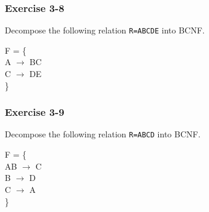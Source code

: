 \begin{frame}
\frametitle{Exercise 3-8}

Decompose the following relation \texttt{R=ABCDE} into BCNF.

F = \{ \\
  A $\rightarrow$ BC\\
  C $\rightarrow$ DE\\
\}

\end{frame}


\begin{frame}
\frametitle{Exercise 3-9}

Decompose the following relation \texttt{R=ABCD} into BCNF.

F = \{ \\
  AB $\rightarrow$ C\\
  B $\rightarrow$ D\\
  C $\rightarrow$ A\\
\}

\end{frame}


